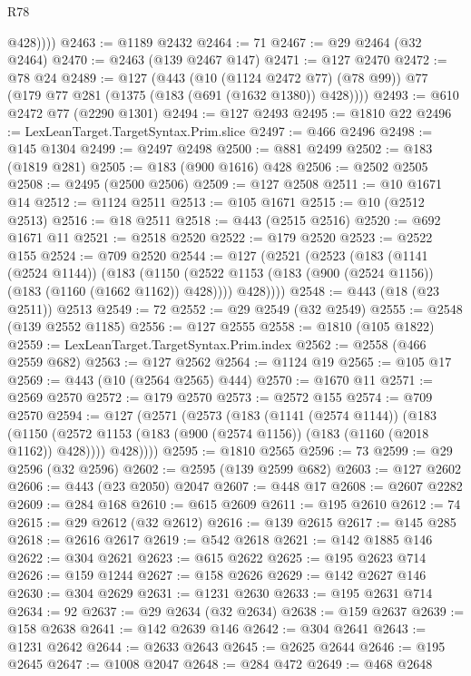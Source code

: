 \begin{lexlean}{R78}
\begin{coremodule}
            @428))))
@2463 := @1189 @2432
@2464 := 71
@2467 := @29 @2464 (@32 @2464)
@2470 := @2463 (@139 @2467 @147)
@2471 := @127 @2470
@2472 := @78 @24
@2489 := @127
    (@443
      (@10 (@1124 @2472 @77) (@78 @99))
      @77
      (@179 @77 @281 (@1375 (@183 (@691 (@1632 @1380)) @428))))
@2493 := @610 @2472 @77 (@2290 @1301)
@2494 := @127 @2493
@2495 := @1810 @22
@2496 := LexLeanTarget.TargetSyntax.Prim.slice
@2497 := @466 @2496
@2498 := @145 @1304
@2499 := @2497 @2498
@2500 := @881 @2499
@2502 := @183 (@1819 @281)
@2505 := @183 (@900 @1616) @428
@2506 := @2502 @2505
@2508 := @2495 (@2500 @2506)
@2509 := @127 @2508
@2511 := @10 @1671 @14
@2512 := @1124 @2511
@2513 := @105 @1671
@2515 := @10 (@2512 @2513)
@2516 := @18 @2511
@2518 := @443 (@2515 @2516)
@2520 := @692 @1671 @11
@2521 := @2518 @2520
@2522 := @179 @2520
@2523 := @2522 @155
@2524 := @709 @2520
@2544 := @127
    (@2521
      (@2523
        (@183
          (@1141 (@2524 @1144))
          (@183
            (@1150 (@2522 @1153 (@183 (@900 (@2524 @1156)) (@183 (@1160 (@1662 @1162)) @428))))
            @428))))
@2548 := @443 (@18 (@23 @2511)) @2513
@2549 := 72
@2552 := @29 @2549 (@32 @2549)
@2555 := @2548 (@139 @2552 @1185)
@2556 := @127 @2555
@2558 := @1810 (@105 @1822)
@2559 := LexLeanTarget.TargetSyntax.Prim.index
@2562 := @2558 (@466 @2559 @682)
@2563 := @127 @2562
@2564 := @1124 @19
@2565 := @105 @17
@2569 := @443 (@10 (@2564 @2565) @444)
@2570 := @1670 @11
@2571 := @2569 @2570
@2572 := @179 @2570
@2573 := @2572 @155
@2574 := @709 @2570
@2594 := @127
    (@2571
      (@2573
        (@183
          (@1141 (@2574 @1144))
          (@183
            (@1150 (@2572 @1153 (@183 (@900 (@2574 @1156)) (@183 (@1160 (@2018 @1162)) @428))))
            @428))))
@2595 := @1810 @2565
@2596 := 73
@2599 := @29 @2596 (@32 @2596)
@2602 := @2595 (@139 @2599 @682)
@2603 := @127 @2602
@2606 := @443 (@23 @2050) @2047
@2607 := @448 @17
@2608 := @2607 @2282
@2609 := @284 @168
@2610 := @615 @2609
@2611 := @195 @2610
@2612 := 74
@2615 := @29 @2612 (@32 @2612)
@2616 := @139 @2615
@2617 := @145 @285
@2618 := @2616 @2617
@2619 := @542 @2618
@2621 := @142 @1885 @146
@2622 := @304 @2621
@2623 := @615 @2622
@2625 := @195 @2623 @714
@2626 := @159 @1244
@2627 := @158 @2626
@2629 := @142 @2627 @146
@2630 := @304 @2629
@2631 := @1231 @2630
@2633 := @195 @2631 @714
@2634 := 92
@2637 := @29 @2634 (@32 @2634)
@2638 := @159 @2637
@2639 := @158 @2638
@2641 := @142 @2639 @146
@2642 := @304 @2641
@2643 := @1231 @2642
@2644 := @2633 @2643
@2645 := @2625 @2644
@2646 := @195 @2645
@2647 := @1008 @2047
@2648 := @284 @472
@2649 := @468 @2648

\end{coremodule}
\end{lexlean}
